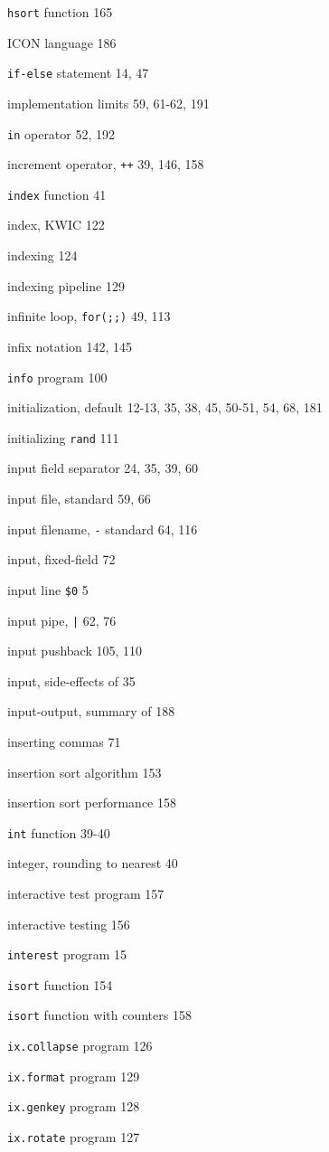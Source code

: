 \begin{multicols}{3}
\verb'hsort' function 165

ICON language 186

\verb'if-else' statement 14, 47

implementation limits 59, 61-62, 191

\verb'in' operator 52, 192

increment operator, \verb'++' 39, 146, 158

\verb'index' function 41

index, KWIC 122

indexing 124

indexing pipeline 129

infinite loop, \verb'for(;;)' 49, 113

infix notation 142, 145

\verb'info' program 100

initialization, default 12-13, 35, 38, 45, 50-51, 54, 68, 181

initializing \verb'rand' 111

input field separator 24, 35, 39, 60

input file, standard 59, 66

input filename, \verb'-' standard 64, 116

input, fixed-field 72

input line \verb'$0' 5

input pipe, \verb'|' 62, 76

input pushback 105, 110

input, side-effects of 35

input-output, summary of 188

inserting commas 71

insertion sort algorithm 153

insertion sort performance 158

\verb'int' function 39-40

integer, rounding to nearest 40

interactive test program 157

interactive testing 156

\verb'interest' program 15 

\verb'isort' function 154

\verb'isort' function with counters 158

\verb'ix.collapse' program 126

\verb'ix.format' program 129 

\verb'ix.genkey' program 128 

\verb'ix.rotate' program 127 


\end{multicols}
